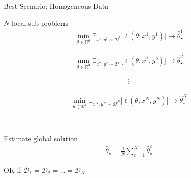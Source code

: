 \documentclass[aspectratio=169,14pt]{beamer}
\begin{document}
\begin{frame}{Best Scenario: Homogeneous Data}

  \begin{minipage}[t]{0.5\linewidth}
    $N$ local sub-problems
    \small
    \begin{align*}
      \min_{\theta \in \mathbb{R}^d}
      \mathbb{E}_{x^1, y^1 \sim \mathcal{D}^1} \Big[ \ell( \theta; x^1, y^1 ) \Big]
      \rightarrow
      \hat\theta_\star^1
    \end{align*}

    \vspace{-2em}
    
    \begin{align*}
      \min_{\theta \in \mathbb{R}^d}
      \mathbb{E}_{x^2, y^2 \sim \mathcal{D}^2} \Big[ \ell( \theta; x^2, y^2 ) \Big]
      \rightarrow
      \hat\theta_\star^2
    \end{align*}

    \vspace{-2em}

    \begin{align*}
      \vdots
    \end{align*}

    \vspace{-2em}
    
    \begin{align*}
      \min_{\theta \in \mathbb{R}^d} 
      \mathbb{E}_{x^N, y^N \sim \mathcal{D}^N} \Big[ \ell( \theta; x^N, y^N ) \Big]
      \rightarrow
      \hat\theta_\star^N
    \end{align*}
  \end{minipage}~~~~%
  \begin{minipage}[t]{0.45\linewidth}
    \pause
    
    Estimate global solution
    \begin{align*}
      \hat\theta_\star
      = \frac{1}{N} \sum_{c=1}^N \hat\theta_\star^c
    \end{align*}

    OK if $\mathcal{D}_1 = \mathcal{D}_2 = \dots = \mathcal{D}_N$ 
  \end{minipage}
  
\end{frame}
\end{document}
